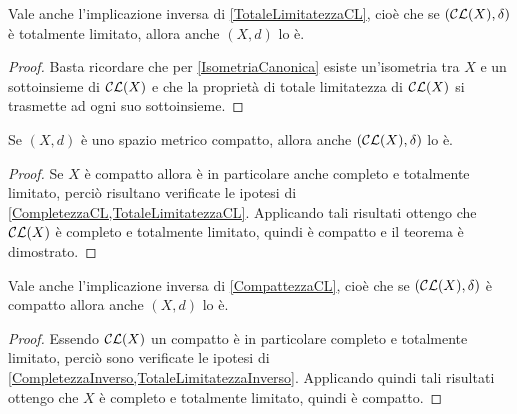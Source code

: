 \begin{remark}\label{TotaleLimitatezzaInverso}
	Vale anche l'implicazione inversa di \cref{TotaleLimitatezzaCL}, cioè che se  $(\mathcal{CL}(X),\delta)$ è totalmente limitato, allora anche $(X,d)$ lo è.
\end{remark}
\begin{proof}
	Basta ricordare che per \cref{IsometriaCanonica} esiste un'isometria tra $X$ e un sottoinsieme di $\mathcal{CL}(X)$ e che la proprietà di totale limitatezza di $\mathcal{CL}(X)$ si trasmette ad ogni suo sottoinsieme.
\end{proof}



\begin{theorem} \label{CompattezzaCL}
	Se $(X,d)$ è uno spazio metrico compatto, allora anche $(\mathcal{CL}(X),\delta)$ lo è.
\end{theorem}
\begin{proof}
	Se $X$ è compatto allora è in particolare anche completo e totalmente limitato, perciò risultano verificate le ipotesi di \cref{CompletezzaCL,TotaleLimitatezzaCL}. Applicando tali risultati ottengo che $\mathcal{CL}(X)$ è completo e totalmente limitato, quindi è compatto e il teorema è dimostrato.
\end{proof}

\begin{remark} \label{CompattezzaInverso}
	Vale anche l'implicazione inversa di \cref{CompattezzaCL}, cioè che se  $(\mathcal{CL}(X),\delta)$ è compatto allora anche $(X,d)$ lo è.
\end{remark}
\begin{proof}
	Essendo $\mathcal{CL}(X)$ un compatto è in particolare completo e totalmente limitato, perciò sono verificate le ipotesi di \cref{CompletezzaInverso,TotaleLimitatezzaInverso}. Applicando quindi tali risultati ottengo che $X$ è completo e totalmente limitato, quindi è compatto.
\end{proof}

